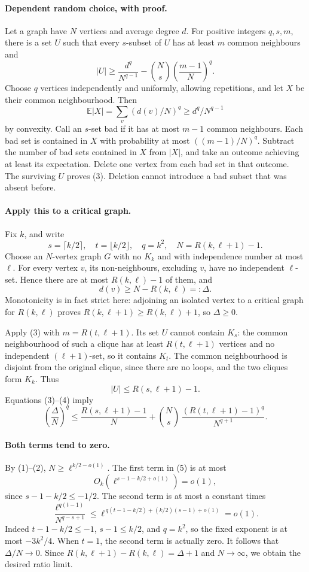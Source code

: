 \paragraph{Dependent random choice, with proof.}
Let a graph have \(N\) vertices and average degree \(d\). For positive integers \(q,s,m\), there is a set \(U\) such that every \(s\)-subset of \(U\) has at least \(m\) common neighbours and
\[
 |U|\geq \frac{d^q}{N^{q-1}}
       -\binom Ns\left(\frac{m-1}{N}\right)^q.
\tag{3}
\]
Choose \(q\) vertices independently and uniformly, allowing repetitions, and let \(X\) be their common neighbourhood. Then
\[
 \mathbb E|X|=\sum_v(d(v)/N)^q\geq d^q/N^{q-1}
\]
by convexity. Call an \(s\)-set bad if it has at most \(m-1\) common neighbours. Each bad set is contained in \(X\) with probability at most \(((m-1)/N)^q\). Subtract the number of bad sets contained in \(X\) from \(|X|\), and take an outcome achieving at least its expectation. Delete one vertex from each bad set in that outcome. The surviving \(U\) proves (3). Deletion cannot introduce a bad subset that was absent before.

\paragraph{Apply this to a critical graph.}
Fix \(k\), and write
\[
 s=\lceil k/2\rceil,\quad t=\lfloor k/2\rfloor,\quad q=k^2,
 \quad N=R(k,\ell+1)-1.
\]
Choose an \(N\)-vertex graph \(G\) with no \(K_k\) and with independence number at most \(\ell\). For every vertex \(v\), its non-neighbours, excluding \(v\), have no independent \(\ell\)-set. Hence there are at most \(R(k,\ell)-1\) of them, and
\[
 d(v)\geq N-R(k,\ell)=:\Delta.
\tag{4}
\]
Monotonicity is in fact strict here: adjoining an isolated vertex to a critical graph for \(R(k,\ell)\) proves \(R(k,\ell+1)\geq R(k,\ell)+1\), so \(\Delta\geq0\).

Apply (3) with \(m=R(t,\ell+1)\). Its set \(U\) cannot contain \(K_s\): the common neighbourhood of such a clique has at least \(R(t,\ell+1)\) vertices and no independent \((\ell+1)\)-set, so it contains \(K_t\). The common neighbourhood is disjoint from the original clique, since there are no loops, and the two cliques form \(K_k\). Thus
\[
 |U|\leq R(s,\ell+1)-1.
\]
Equations (3)--(4) imply
\[
 \left(\frac{\Delta}{N}\right)^q
 \leq\frac{R(s,\ell+1)-1}{N}
 +\binom Ns\,\frac{(R(t,\ell+1)-1)^q}{N^{q+1}}.
\tag{5}
\]

\paragraph{Both terms tend to zero.}
By (1)--(2), \(N\geq\ell^{k/2-o(1)}\). The first term in (5) is at most
\[
 O_k(\ell^{s-1-k/2+o(1)})=o(1),
\]
since \(s-1-k/2\leq-1/2\). The second term is at most a constant times
\[
 \frac{\ell^{q(t-1)}}{N^{q-s+1}}
 \leq \ell^{\,q(t-1-k/2)+(k/2)(s-1)+o(1)}=o(1).
\]
Indeed \(t-1-k/2\leq-1\), \(s-1\leq k/2\), and \(q=k^2\), so the fixed exponent is at most \(-3k^2/4\). When \(t=1\), the second term is actually zero. It follows that \(\Delta/N\to0\). Since \(R(k,\ell+1)-R(k,\ell)=\Delta+1\) and \(N\to\infty\), we obtain the desired ratio limit.

